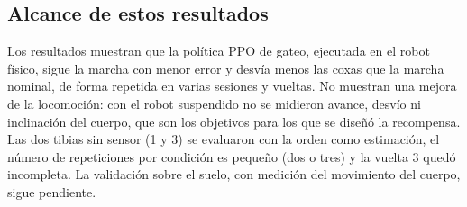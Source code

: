 \subsection{Alcance de estos resultados}

Los resultados muestran que la política PPO de gateo, ejecutada en el robot
físico, sigue la marcha con menor error y desvía menos las coxas que la marcha
nominal, de forma repetida en varias sesiones y vueltas. No muestran una mejora
de la locomoción: con el robot suspendido no se midieron avance, desvío ni
inclinación del cuerpo, que son los objetivos para los que se diseñó la
recompensa. Las dos tibias sin sensor (1 y 3) se evaluaron con la orden como
estimación, el número de repeticiones por condición es pequeño (dos o tres) y
la vuelta 3 quedó incompleta. La validación sobre el suelo, con medición del
movimiento del cuerpo, sigue pendiente.

